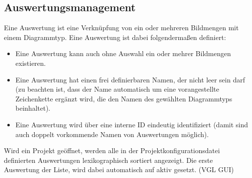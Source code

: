 \subsection{Auswertungsmanagement}
\label{subsec:auswertungsmgmt}

	Eine Auswertung ist eine Verknüpfung von ein oder mehreren Bildmengen mit einem Diagrammtyp. Eine Auswertung ist dabei folgendermaßen definiert:

	\begin{itemize}

		\item Eine Auswertung kann auch ohne Auswahl ein oder mehrer Bildmengen existieren. 

		\item Eine Auswertung hat einen frei definierbaren Namen, der nicht leer sein darf (zu beachten ist, dass der Name automatisch um eine vorangestellte Zeichenkette ergänzt wird, die den Namen des gewählten Diagrammtyps beinhaltet).

		\item Eine Auswertung wird über eine interne ID eindeutig identifiziert (damit sind auch doppelt vorkommende Namen von Auswertungen möglich).

	\end{itemize}

	Wird ein Projekt geöffnet, werden alle in der Projektkonfigurationsdatei definierten Auswertungen lexikographisch sortiert angezeigt. Die erste Auswertung der Liste, wird dabei automatisch auf aktiv gesetzt. (VGL GUI)

